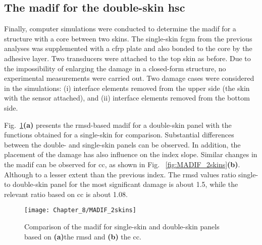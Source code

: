 \subsection{The \ac{madif} for the double-skin \ac{hsc}}

Finally, computer simulations were conducted to determine the \ac{madif} for a structure with a core between two skins.
The single-skin \ac{fcgm} from the previous analyses was supplemented with a \ac{cfrp} plate and also bonded to the core by the adhesive layer.
Two transducers were attached to the top skin as before.
Due to the impossibility of enlarging the damage in a closed-form structure, no experimental measurements were carried out.
Two damage cases were considered in the simulations: (i) interface elements removed from the upper side (the skin with the sensor attached), and (ii) interface elements removed from the bottom side.

Fig.~\ref{fig:madif_2skins}\textbf{(a)} presents the \ac{rmsd}-based \ac{madif} for a double-skin panel with the functions obtained for a single-skin for comparison.
Substantial differences between the double- and single-skin panels can be observed.
In addition, the placement of the damage has also influence on the index slope.
Similar changes in the \ac{madif} can be observed for \ac{cc}, as shown in Fig. ~\ref{fig:MADIF_2skins}\textbf{(b)}.
Although to a lesser extent than the previous index. 
The \ac{rmsd} values ratio single- to double-skin panel for the most significant damage is about 1.5, while the relevant ratio based on \ac{cc} is about 1.08.
\begin{figure}
	\begin{center}
		\texttt{[image: Chapter\_8/MADIF\_2skins]}
	\end{center}
	\caption{Comparison of the \acf{madif} for single-skin and double-skin panels based on \textbf{(a)}the \acf{rmsd} and \textbf{(b)} the \acf{cc}.}
	\label{fig:madif_2skins}
\end{figure}